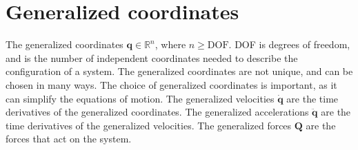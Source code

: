 \section{Generalized coordinates}
The generalized coordinates $\mathbf{q} \in \mathbb{R}^n$, where $n \geq \text{DOF}$. DOF is degrees of freedom, and is the number of independent coordinates needed to describe the configuration of a system. The generalized coordinates are not unique, and can be chosen in many ways. The choice of generalized coordinates is important, as it can simplify the equations of motion. The generalized velocities $\dot{\mathbf{q}}$ are the time derivatives of the generalized coordinates. The generalized accelerations $\ddot{\mathbf{q}}$ are the time derivatives of the generalized velocities. The generalized forces $\mathbf{Q}$ are the forces that act on the system.